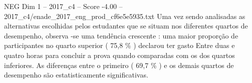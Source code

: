 \begin{textsample}{NEG Dim 1 – 2017\_c4 – Score -4.00 – 2017\_c4/enade\_2017\_eng\_prod\_cf6e5e5935.txt}
Uma vez sendo analisadas as alternativas escolhidas pelos estudantes que se situam nos diferentes quartos de desempenho, observa -se uma tendência crescente : uma maior proporção de participantes no quarto superior ( 75,8 \% ) declarou ter gasto Entre duas e quatro horas para concluir a prova quando comparadas com os dos quartos inferiores.
As diferenças entre o primeiro ( 69,7 \% ) e os demais quartos de desempenho são estatisticamente significativas.

\end{textsample}
